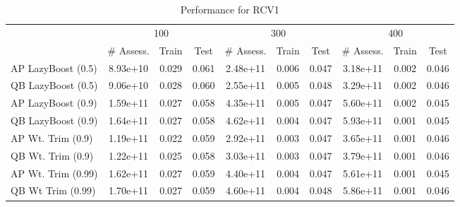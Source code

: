 \begin{table*}[ht]
\caption{Performance for RCV1}
\label{tbl:perf-rcv1}
\vskip 0.15in
\begin{center}
\begin{small}
\begin{sc}
\begin{tabular}{lccccccccc}
\toprule
	& \multicolumn{3}{c}{100}
	& \multicolumn{3}{c}{300}
	& \multicolumn{3}{c}{400}
	\\
 & \# Assess. & Train & Test & \# Assess. & Train & Test & \# Assess. & Train & Test \\
\midrule
AP LazyBoost (0.5) & 8.93e+10 & 0.029 & 0.061 & 2.48e+11 & 0.006 & 0.047 & 3.18e+11 & 0.002 & 0.046 \\
QB LazyBoost (0.5) & 9.06e+10 & 0.028 & 0.060 & 2.55e+11 & 0.005 & 0.048 & 3.29e+11 & 0.002 & 0.046 \\
AP LazyBoost (0.9) & 1.59e+11 & 0.027 & 0.058 & 4.35e+11 & 0.005 & 0.047 & 5.60e+11 & 0.002 & 0.045 \\
QB LazyBoost (0.9) & 1.64e+11 & 0.027 & 0.058 & 4.62e+11 & 0.004 & 0.047 & 5.93e+11 & 0.001 & 0.045 \\
AP Wt. Trim (0.9) & 1.19e+11 & 0.022 & 0.059 & 2.92e+11 & 0.003 & 0.047 & 3.65e+11 & 0.001 & 0.046 \\
QB Wt. Trim (0.9) & 1.22e+11 & 0.025 & 0.058 & 3.03e+11 & 0.003 & 0.047 & 3.79e+11 & 0.001 & 0.046 \\
AP Wt. Trim (0.99) & 1.62e+11 & 0.027 & 0.059 & 4.40e+11 & 0.004 & 0.047 & 5.61e+11 & 0.001 & 0.045 \\
QB Wt Trim (0.99) & 1.70e+11 & 0.027 & 0.059 & 4.60e+11 & 0.004 & 0.048 & 5.86e+11 & 0.001 & 0.046 \\
\bottomrule
\end{tabular}
\end{sc}
\end{small}
\end{center}
\vskip -0.1in
\end{table*}

